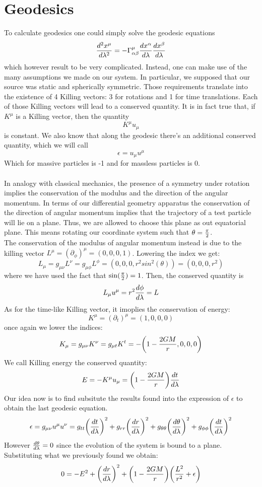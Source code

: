 \documentclass[]{article}
\theoremstyle{definition}
\theoremstyle{Theorem}
\theoremstyle{definition}
\theoremstyle{definition}
\theoremstyle{definition}
\begin{document}
\section{Geodesics}
To calculate geodesics one could simply solve the geodesic equations $${d^2x^\mu\over d\lambda^2}=-\Gamma_{\alpha\beta}^\mu{dx^\alpha\over d\lambda}{dx^\beta\over d\lambda}$$
which however result to be very complicated. Instead, one can make use of the many assumptions we made on our system. In particular, we supposed that our source was static and spherically symmetric. Those requirements translate into the existence of 4 Killing vectors: 3 for rotations and 1 for time translations. Each of those Killing vectors will lead to a conserved quantity. It is in fact true that, if $K^\mu$ is a Killing vector, then the quantity $$K^\mu u_\mu$$
is constant. We also know that along the geodesic there's an additional conserved quantity, which we will call
$$\epsilon=u_\mu u^\mu$$
Which for massive particles is -1 and for massless particles is 0.\\
\\
In analogy with classical mechanics, the presence of a symmetry under rotation implies the conservation of the modulus and the direction of the angular momentum. In terms of our differential geometry apparatus the conservation of the direction of angular momentum implies that the trajectory of a test particle will lie on a plane. Thus, we are allowed to choose this plane as out equatorial plane. This means rotating our coordinate system such that $\theta={\pi\over2}$.\\
The conservation of the modulus of angular momentum instead is due to the killing vector $L^\mu=(\partial_\phi)^\mu=(0,0,0,1)$. Lowering the index we get:
$$L_\mu=g_{\mu\nu}L^\nu=g_{\mu\phi}L^\phi=(0,0,0,r^2sin^2(\theta))=(0,0,0,r^2)$$
where we have used the fact that $\sin({\pi\over2})=1$.
Then, the conserved quantity is $$L_\mu u^\mu=r^2{d\phi\over d\lambda}=L$$
As for the time-like Killing vector, it imoplies the conservation of energy: 
$$K^\mu=(\partial_t)^\mu=(1,0,0,0)$$
once again we lower the indices:
$$K_\mu=g_{\mu\nu}K^\nu=g_{\mu t}K^t=-\bigg(1-{2GM\over r},0,0,0\bigg)$$
We call Killing energy the conserved quantity:
$$E=-K^\mu u_\mu=\bigg(1-{2GM\over r}\bigg){dt\over d\lambda}$$
Our idea now is to find subsitute the results found into the expression of $\epsilon$ to obtain the last geodesic equation.
$$\epsilon=g_{\mu\nu}u^\mu u^\nu=g_{tt}\bigg({dt\over d\lambda}\bigg)^2+g_{rr}\bigg({dr\over d\lambda}\bigg)^2+g_{\theta\theta}\bigg({d\theta\over d\lambda}\bigg)^2+g_{\phi\phi}\bigg({dt\over d\lambda}\bigg)^2$$
However ${d\theta\over d\lambda}=0$ since the evolution of the system is bound to a plane. Substituting what we previously found we obtain:
$$0=-E^2+\bigg({dr\over d\lambda}\bigg)^2+\bigg(1-{2GM\over r}\bigg)\bigg({L^2\over r^2}+\epsilon\bigg)$$
\end{document}
